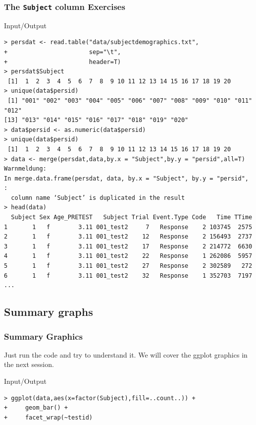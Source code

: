 \documentclass[xcolor={table},c]{beamer}
\begin{document}
\begin{frame}[fragile]\frametitle{The \texttt{Subject} column Exercises}
\begin{exampleblock}{Input/Output}\tiny
\begin{verbatim}
> persdat <- read.table("data/subjectdemographics.txt",
+                       sep="\t",
+                       header=T)
> persdat$Subject
 [1]  1  2  3  4  5  6  7  8  9 10 11 12 13 14 15 16 17 18 19 20
> unique(data$persid)
 [1] "001" "002" "003" "004" "005" "006" "007" "008" "009" "010" "011" "012"
[13] "013" "014" "015" "016" "017" "018" "019" "020"
> data$persid <- as.numeric(data$persid)
> unique(data$persid)
 [1]  1  2  3  4  5  6  7  8  9 10 11 12 13 14 15 16 17 18 19 20
> data <- merge(persdat,data,by.x = "Subject",by.y = "persid",all=T)
Warnmeldung:
In merge.data.frame(persdat, data, by.x = "Subject", by.y = "persid",  :
  column name ‘Subject’ is duplicated in the result
> head(data)
  Subject Sex Age_PRETEST   Subject Trial Event.Type Code   Time TTime
1       1   f        3.11 001_test2     7   Response    2 103745  2575
2       1   f        3.11 001_test2    12   Response    2 156493  2737
3       1   f        3.11 001_test2    17   Response    2 214772  6630
4       1   f        3.11 001_test2    22   Response    1 262086  5957
5       1   f        3.11 001_test2    27   Response    2 302589   272
6       1   f        3.11 001_test2    32   Response    1 352703  7197
...
\end{verbatim}
    \end{exampleblock}
\end{frame}


\subsection{Summary graphs}
\begin{frame}[fragile]\frametitle{Summary Graphics}
Just run the code and try to understand it. We will cover the ggplot graphics in the next session.
\begin{exampleblock}{Input/Output}\tiny
\begin{verbatim}
> ggplot(data,aes(x=factor(Subject),fill=..count..)) +
+     geom_bar() +
+     facet_wrap(~testid)
\end{verbatim}
    \end{exampleblock}
\begin{center}
\end{center}
\end{frame}
\end{document}
